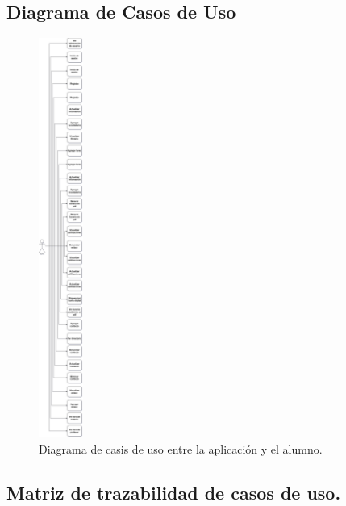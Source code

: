 \documentclass[10pt]{article}
\begin{document}
\subsection{Diagrama de Casos de Uso}
\begin{figure}[H]
    \begin{center}
        \includegraphics[width=0.13\textwidth]{Imagenes/SOE_CASOSDEUSO.PNG}
        \caption{Diagrama de casis de uso entre la aplicación y el alumno.}
        \label{fig8}
    \end{center}
\end{figure}

\newpage
\subsection{Matriz de trazabilidad de casos de uso.}
\end{document}
